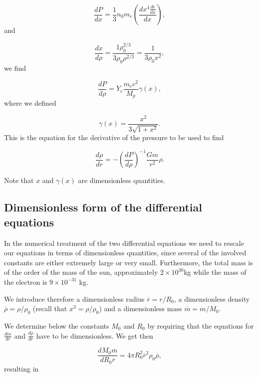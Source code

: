 \documentclass[%
oneside,                 %
final,                   %
10pt]{article}
\begin{document}
\begin{equation*}
\frac{dP}{dx}=\frac{1}{3}n_0m_e
\left(\frac{dx^4\frac{d\epsilon}{dx}}{dx}\right),
\end{equation*}
and

\begin{equation*}
\frac{dx}{d\rho}=\frac{1\rho_0^{2/3}}{3\rho_0\rho^{2/3}}
=\frac{1}{3\rho_0 x^2},
\end{equation*}
we find

\begin{equation*}
\frac{dP}{d\rho}=Y_{e}\frac{m_{e}c^2}{M_{p}}\gamma (x),
\end{equation*}
where we defined

\begin{equation*}
\gamma (x)=\frac{x^{2}}{3\sqrt{1+x^{2}}}.
\end{equation*}
This is the equation for the derivative of the pressure to be used to find

\begin{equation*}
\frac{d\rho}{dr}=-\left(\frac{dP}{d\rho}\right)^{-1}\frac{Gm}{r^{2}}\rho.
\end{equation*}

Note that $x$ and $\gamma(x)$ are dimensionless quantities.

\subsection{Dimensionless form of the differential equations}

In the numerical treatment of the two differential equations we need
to rescale our equations in terms of dimensionless quantities, since several of the
involved constants are either extremely large or very small.
Furthermore, the total mass is of the order of the mass of the sun, approximately
$2\times 10^{30}$kg while the mass of the electron is $9\times 10^{-31}$ kg.

We introduce therefore a dimensionless radius $\overline{r}=r/R_{0}$, a dimensionless density
$\overline{\rho}=\rho /\rho_{0}$ (recall that $x^{3}=\rho /\rho_{0}$)
and a dimensionless mass $\overline{m}=m/M_{0}$.

We determine below the constants  $M_{0}$ and $R_{0}$ by requiring that the equations
for $\frac{dm}{dr}$ and $\frac{d\rho}{dr}$ have to be dimensionless.  
We get then

\begin{equation*}
\frac{dM_0\overline{m}}{dR_0\overline{r}}=
4\pi R_0^2\overline{r}^{2}\rho_0\overline{\rho},
\end{equation*}
resulting in
\end{document}
